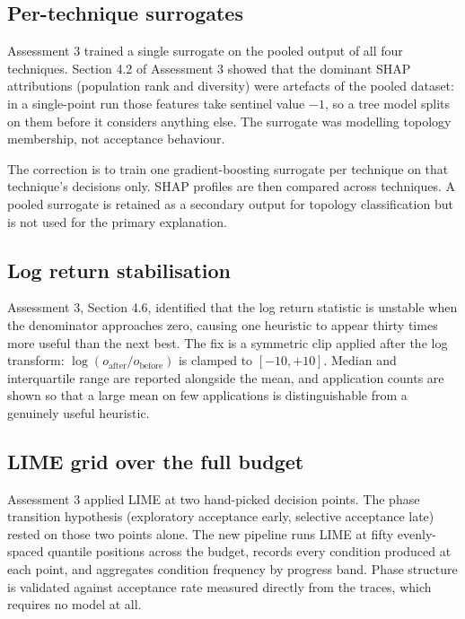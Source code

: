 \documentclass[11pt,a4paper]{article}
\begin{document}
\subsection{Per-technique surrogates}

Assessment 3 trained a single surrogate on the pooled output of all four techniques.
Section 4.2 of Assessment 3 showed that the dominant SHAP attributions (population
rank and diversity) were artefacts of the pooled dataset: in a single-point run
those features take sentinel value $-1$, so a tree model splits on them before it
considers anything else. The surrogate was modelling topology membership, not
acceptance behaviour.

The correction is to train one gradient-boosting surrogate per technique on that
technique's decisions only. SHAP profiles are then compared across techniques. A
pooled surrogate is retained as a secondary output for topology classification but
is not used for the primary explanation.

\subsection{Log return stabilisation}

Assessment 3, Section 4.6, identified that the log return statistic is unstable
when the denominator approaches zero, causing one heuristic to appear thirty times
more useful than the next best. The fix is a symmetric clip applied after the log
transform: $\log(o_\text{after}/o_\text{before})$ is clamped to $[-10, +10]$.
Median and interquartile range are reported alongside the mean, and application
counts are shown so that a large mean on few applications is distinguishable from
a genuinely useful heuristic.

\subsection{LIME grid over the full budget}

Assessment 3 applied LIME at two hand-picked decision points. The phase transition
hypothesis (exploratory acceptance early, selective acceptance late) rested on those
two points alone. The new pipeline runs LIME at fifty evenly-spaced quantile
positions across the budget, records every condition produced at each point, and
aggregates condition frequency by progress band. Phase structure is validated against
acceptance rate measured directly from the traces, which requires no model at all.
\end{document}
